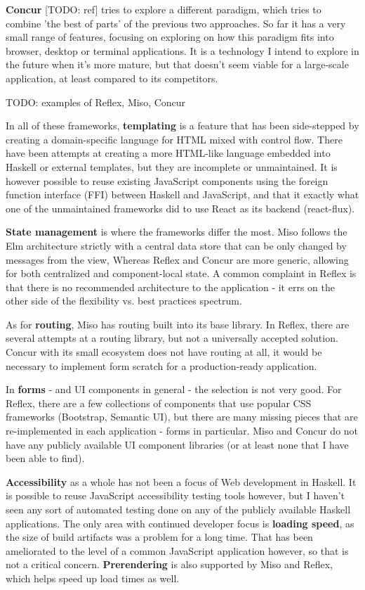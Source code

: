 \documentclass[english,odsaz]{fitthesis}
\begin{document}
\textbf{Concur} [TODO: ref] tries to explore a different paradigm, which tries to combine
'the best of parts' of the previous two approaches. So far it has a very small
range of features, focusing on exploring on how this paradigm fits into browser,
desktop or terminal applications. It is a technology I intend to explore in the
future when it's more mature, but that doesn't seem viable for a large-scale
application, at least compared to its competitors.

TODO: examples of Reflex, Miso, Concur

In all of these frameworks, \textbf{templating} is a feature that has been side-stepped
by creating a domain-specific language for HTML mixed with control flow. There
have been attempts at creating a more HTML-like language embedded into Haskell
or external templates, but they are incomplete or unmaintained. It is however
possible to reuse existing JavaScript components using the foreign function
interface (FFI) between Haskell and JavaScript, and that it exactly what one of
the unmaintained frameworks did to use React as its backend (react-flux).

\textbf{State management} is where the frameworks differ the most. Miso follows the Elm
architecture strictly with a central data store that can be only changed by
messages from the view, Whereas Reflex and Concur are more generic, allowing for
both centralized and component-local state. A common complaint in Reflex is that
there is no recommended architecture to the application - it errs on the other
side of the flexibility vs. best practices spectrum.

As for \textbf{routing}, Miso has routing built into its base library. In Reflex, there
are several attempts at a routing library, but not a universally accepted
solution. Concur with its small ecosystem does not have routing at all, it would
be necessary to implement form scratch for a production-ready application.

In \textbf{forms} - and UI components in general - the selection is not very good. For
Reflex, there are a few collections of components that use popular CSS
frameworks (Bootstrap, Semantic UI), but there are many missing pieces that are
re-implemented in each application - forms in particular. Miso and Concur do not have any publicly
available UI component libraries (or at least none that I have been able to find).

\textbf{Accessibility} as a whole has not been a focus of Web development in Haskell. It
is possible to reuse JavaScript accessibility testing tools however, but I
haven't seen any sort of automated testing done on any of the publicly available
Haskell applications. The only area with continued developer focus is \textbf{loading
speed}, as the size of build artifacts was a problem for a long time. That has
been ameliorated to the level of a common JavaScript application however, so
that is not a critical concern. \textbf{Prerendering} is also supported by Miso and
Reflex, which helps speed up load times as well.
\end{document}
